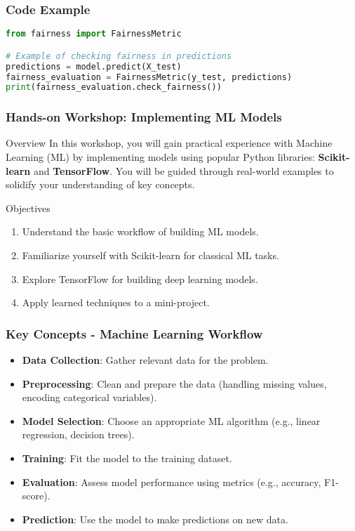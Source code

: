 \documentclass{beamer}
\begin{document}
\begin{frame}[fragile]
    \frametitle{Code Example}
    \begin{lstlisting}[language=Python]
from fairness import FairnessMetric

# Example of checking fairness in predictions
predictions = model.predict(X_test)
fairness_evaluation = FairnessMetric(y_test, predictions)
print(fairness_evaluation.check_fairness())
    \end{lstlisting}
\end{frame}

\begin{frame}[fragile]
    \frametitle{Hands-on Workshop: Implementing ML Models}
    \begin{block}{Overview}
        In this workshop, you will gain practical experience with Machine Learning (ML) by implementing models using popular Python libraries: \textbf{Scikit-learn} and \textbf{TensorFlow}. You will be guided through real-world examples to solidify your understanding of key concepts.
    \end{block}
    
    \begin{block}{Objectives}
        \begin{enumerate}
            \item Understand the basic workflow of building ML models.
            \item Familiarize yourself with Scikit-learn for classical ML tasks.
            \item Explore TensorFlow for building deep learning models.
            \item Apply learned techniques to a mini-project.
        \end{enumerate}
    \end{block}
\end{frame}

\begin{frame}[fragile]
    \frametitle{Key Concepts - Machine Learning Workflow}
    \begin{itemize}
        \item \textbf{Data Collection}: Gather relevant data for the problem.
        \item \textbf{Preprocessing}: Clean and prepare the data (handling missing values, encoding categorical variables).
        \item \textbf{Model Selection}: Choose an appropriate ML algorithm (e.g., linear regression, decision trees).
        \item \textbf{Training}: Fit the model to the training dataset.
        \item \textbf{Evaluation}: Assess model performance using metrics (e.g., accuracy, F1-score).
        \item \textbf{Prediction}: Use the model to make predictions on new data.
    \end{itemize}
\end{frame}
\end{document}
